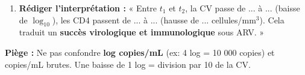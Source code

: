 \documentclass[11pt]{article}
\begin{document}
\begin{methode}
\begin{enumerate}
\begin{itemize}
        \item \textbf{Échec immunologique :} CV indétectable MAIS CD4 ne remontent pas ($< 350$ ou gain $< 50-100$/an) $\rightarrow$ Recherche cause (inflammation, co-infections, âge, toxicité).
    \end{itemize}
    \item \textbf{Rédiger l'interprétation :} « Entre $t_1$ et $t_2$, la CV passe de ... à ... (baisse de $\log_{10}$), les CD4 passent de ... à ... (hausse de ... cellules/mm$^3$). Cela traduit un \textbf{succès virologique et immunologique} sous ARV. »
\end{enumerate}
\textbf{Piège :} Ne pas confondre \textbf{log copies/mL} (ex: 4 log = 10 000 copies) et copies/mL brutes. Une baisse de 1 log = division par 10 de la CV.
\end{methode}
\end{document}
